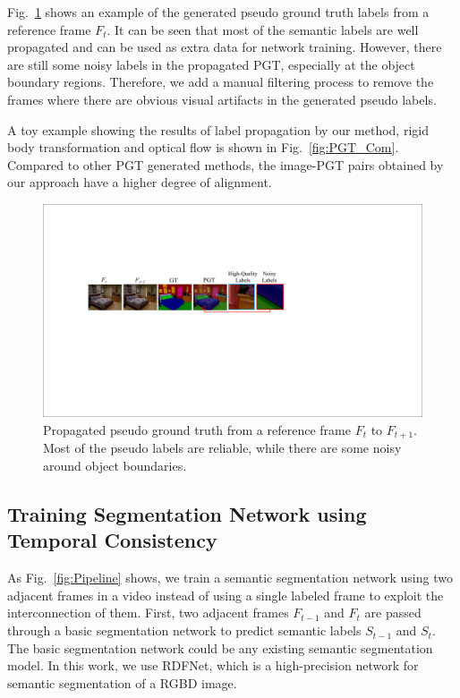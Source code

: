 Fig.~\ref{fig:PGT} shows an example of the generated pseudo ground truth labels from a reference frame $F_t$. 
It can be seen that most of the semantic labels are well propagated and can be used as extra data for network training. 
% 
However, there are still some noisy labels in the propagated PGT, especially at the object boundary regions. 
%
Therefore, we add a manual filtering process to remove the frames where there are obvious visual artifacts in the generated pseudo labels.

A toy example showing the results of label propagation by our method, rigid body transformation and optical flow is shown in Fig.~\ref{fig:PGT_Com}.
%
Compared to other PGT generated methods, the image-PGT pairs obtained by our approach have a higher degree of alignment.
\begin{figure}[t]
	\centering
	\includegraphics[width=\columnwidth]{figure/PGT.pdf}
	\caption{Propagated pseudo ground truth from a reference frame $F_t$ to $F_{t+1}$. Most of the pseudo labels are reliable, while there are some noisy around object boundaries.}
	\label{fig:PGT}
\end{figure}

\subsection{Training Segmentation Network using Temporal Consistency}
%
As Fig.~\ref{fig:Pipeline} shows, we train a semantic segmentation network using two adjacent frames in a video instead of using a single labeled frame to exploit the interconnection of them.  
% 
First, two adjacent frames $F_{t-1}$ and $F_t$ are passed through a basic segmentation network to predict semantic labels $S_{t-1}$ and $S_{t}$.
%
The basic segmentation network could be any existing semantic segmentation model. 
%
In this work, we use RDFNet\cite{Park2017}, which is a high-precision network for semantic segmentation of a RGBD image.

